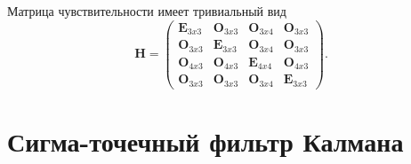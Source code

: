 Матрица чувствительности имеет тривиальный вид
\begin{equation}
{\bm{H}} =
\left( {\begin{array}{*{20}{c}}
	{{{\bm{E}}_{3x3}}}&{{{\bm{O}}_{3x3}}}&{{{\bm{O}}_{3x4}}}&{{{\bm{O}}_{3x3}}}\\
	{{{\bm{O}}_{3x3}}}&{{{\bm{E}}_{3x3}}}&{{\bm{O}}_{3x4}}&{{{\bm{O}}_{3x3}}}\\
	{{{\bm{O}}_{4x3}}}&{{{\bm{O}}_{4x3}}}&{{{\bm{E}}_{4x4}}}&{{{\bm{O}}_{4x3}}}\\
	{{{\bm{O}}_{3x3}}}&{{{\bm{O}}_{3x3}}}&{{{\bm{O}}_{3x4}}}&{{{\bm{E}}_{3x3}}}
	\end{array}} \right).
\end{equation}

\section{Сигма-точечный фильтр Калмана}

